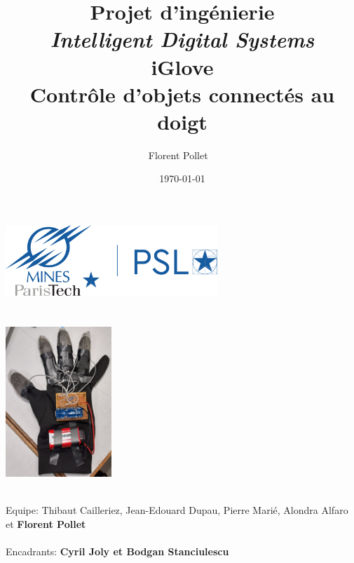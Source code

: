 \title{\Large Projet d'ingénierie\\
        \emph{Intelligent Digital Systems} \\
        \bf\Large iGlove \\
        Contrôle d’objets connectés au doigt}
\author{\large Florent Pollet \ \\}
\date{\large\today}

\makeatletter
    \begin{titlepage}
        \begin{center}
	   { \includegraphics[width=8cm]{imgs/mp_logo.png}}
	   {\ \\ \ \\}
        \vbox{}\vspace{1cm}
            {\@title }\\[0.5cm] 

            {
                \includegraphics[width=0.3\textwidth]{imgs/Gant.png}
            }

            {\large \ \\ Equipe: Thibaut Cailleriez, Jean-Edouard Dupau, Pierre Marié, Alondra Alfaro et \bf Florent Pollet\ \\}
            {\large \ \\ Encadrants: \bf Cyril Joly et Bodgan Stanciulescu\ \\}
            \vspace{1cm}
            {\@date\\}
            \vspace{0.5cm}

        \end{center}




\end{titlepage}
